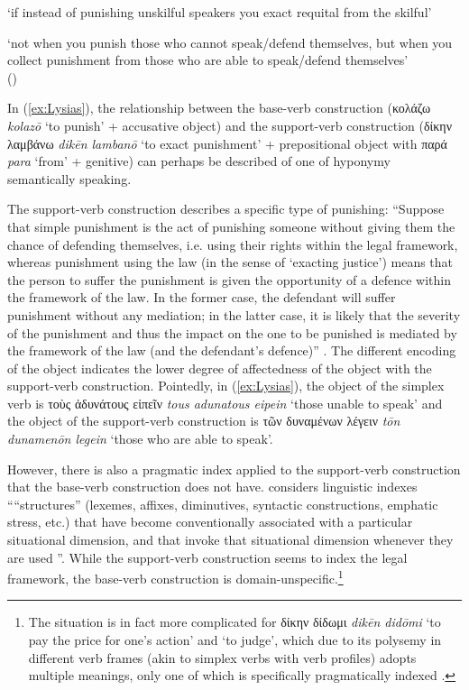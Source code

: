 \documentclass[output=paper,colorlinks,citecolor=brown]{langscibook}
\begin{document}
\glt ‘if instead of punishing unskilful speakers you exact requital from the skilful’ \citep[627]{lambLysiasLysiasEnglish1930}


‘not when you punish those who cannot speak/defend themselves, but when you collect punishment from those who are able to speak/defend themselves’ \citep[397]{fendelSupportverbConstructionsObjects2023} \\

\hspace*{\fill}()
\z

In (\ref{ex:Lysias}), the relationship between the base-verb construction (κολάζω \textit{kolazō} ‘to punish' + accusative object) and the support-verb construction (δίκην λαμβάνω \textit{dikēn lambanō} ‘to exact punishment' + prepositional object with παρά \textit{para} ‘from' + genitive) can perhaps be described of one of hyponymy semantically speaking. 


The support-verb construction describes a specific type of punishing: “Suppose that simple punishment is the act of punishing someone without giving them the chance of defending themselves, i.e. using their rights within the legal framework, whereas punishment using the law (in the sense of ‘exacting justice’) means that the person to suffer the punishment is given the opportunity of a defence within the framework of the law. In the former case, the defendant will suffer punishment without any mediation; in the latter case, it is likely that the severity of the punishment and thus the impact on the one to be punished is mediated by the framework of the law (and the defendant’s defence)” \citep[397]{fendelSupportverbConstructionsObjects2023}. The different encoding of the object indicates the lower degree of affectedness of the object with the support-verb construction. Pointedly, in (\ref{ex:Lysias}), the object of the simplex verb is τοὺς ἀδυνάτους εἰπεῖν \textit{tous adunatous eipein} ‘those unable to speak’ and the object of the support-verb construction is τῶν δυναμένων λέγειν \textit{tōn dunamenōn legein} ‘those who are able to speak’. 


However, there is also a pragmatic index applied to the support-verb construction that the base-verb construction does not have. \citet[123]{benteinDimensionsSocialMeaning2019} considers linguistic indexes ““structures” (lexemes, affixes, diminutives, syntactic constructions, emphatic stress, etc.) that have become conventionally associated with a particular situational dimension, and that invoke that situational dimension whenever they are used \citep[411]{ochsResourcesSocializingHumanity1996}”. While the support-verb construction seems to index the legal framework, the base-verb construction is domain-unspecific.\footnote{The situation is in fact more complicated for δίκην δίδωμι \textit{dikēn didōmi} ‘to pay the price for one's action' and ‘to judge',  which due to its polysemy in different verb frames (akin to simplex verbs with verb profiles) adopts multiple meanings, only one of which is specifically pragmatically indexed \citep{FendelDiversity}.}  
\end{document}
